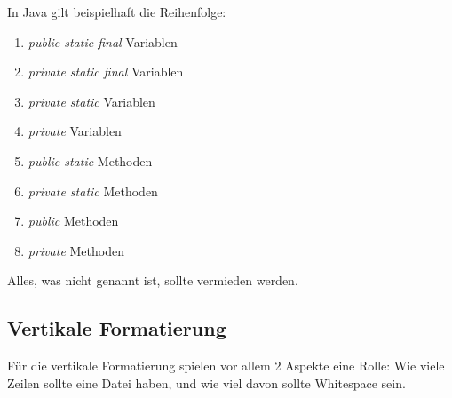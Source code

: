         In Java gilt beispielhaft die Reihenfolge:
        \begin{enumerate}
            \item \textit{public static final} Variablen
            \item \textit{private static final} Variablen
            \item \textit{private static} Variablen
            \item \textit{private} Variablen
            \item \textit{public static} Methoden
            \item \textit{private static} Methoden
            \item \textit{public} Methoden
            \item \textit{private} Methoden
        \end{enumerate}
        Alles, was nicht genannt ist, sollte vermieden werden.

    \subsection{Vertikale Formatierung}
        Für die vertikale Formatierung spielen vor allem 2 Aspekte eine Rolle: Wie viele Zeilen sollte eine Datei haben, und wie viel davon sollte Whitespace sein.
